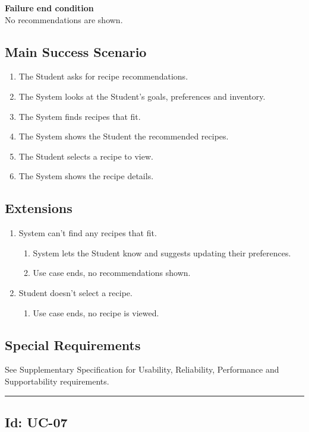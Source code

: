 \documentclass[10pt,letterpaper]{article}
\newcommand{\ucseparator}{\vspace{1em}\noindent\rule{\linewidth}{0.4pt}\vspace{1.5em}}
\begin{document}
\textbf{Failure end condition}\\
No recommendations are shown.

\subsection*{Main Success Scenario}
\begin{enumerate}
    \item The Student asks for recipe recommendations.
    \item The System looks at the Student's goals, preferences and inventory.
    \item The System finds recipes that fit.
    \item The System shows the Student the recommended recipes.
    \item The Student selects a recipe to view.
    \item The System shows the recipe details.
\end{enumerate}

\subsection*{Extensions}
\begin{enumerate}
    \item[3a.] System can't find any recipes that fit.
    \begin{enumerate}
        \item[1.] System lets the Student know and suggests updating their preferences.
        \item[2.] Use case ends, no recommendations shown.
    \end{enumerate}
    \item[5a.] Student doesn't select a recipe.
    \begin{enumerate}
        \item[1.] Use case ends, no recipe is viewed.
    \end{enumerate}
\end{enumerate}

\subsection*{Special Requirements}
See Supplementary Specification for Usability, Reliability, Performance and Supportability requirements.

\ucseparator

\subsection*{Id: UC-07}
\end{document}
